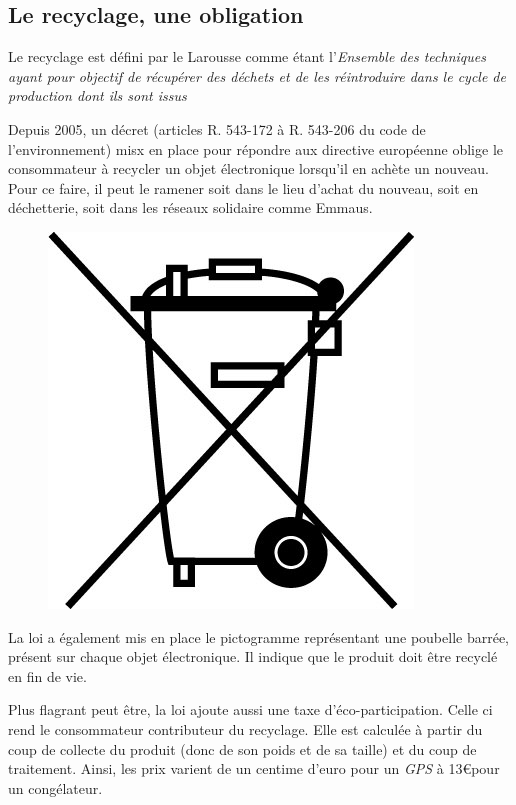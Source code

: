 \subsection{Le recyclage, une obligation}

Le recyclage est défini par le Larousse  comme étant l'\og{}\textit{Ensemble des techniques ayant pour objectif de récupérer des déchets et de les réintroduire dans le cycle de production dont ils sont issus}\fg{}

Depuis 2005, un décret (articles R. 543-172 à R. 543-206 du code de l'environnement) misx en place pour répondre aux directive européenne oblige le consommateur à recycler un objet électronique lorsqu'il en achète un nouveau. Pour ce faire, il peut le ramener soit dans le lieu d'achat du nouveau, soit en déchetterie, soit dans les réseaux solidaire comme Emmaus.

\begin{figure}
\includegraphics[scale=1]{Rsc/pictopoubellebarree.jpg} 
\end{figure} 
La loi a également mis en place le pictogramme représentant une poubelle barrée, présent sur chaque objet électronique. Il indique que le produit doit être recyclé en fin de vie. 

Plus flagrant peut être, la loi ajoute aussi une taxe d'éco-participation. Celle ci rend le consommateur contributeur du recyclage. Elle est calculée à partir du coup de collecte du produit (donc de son poids et de sa taille) et du coup de traitement. Ainsi, les prix varient de un centime d'euro pour un \textit{GPS} à 13\euro pour un congélateur. 

